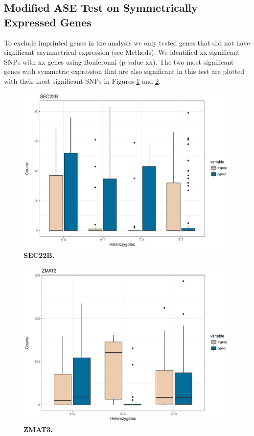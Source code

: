 \subsection{Modified ASE Test on Symmetrically Expressed Genes}\label{Modified ASE Test on Symmetrically Expressed Genes} 
To exclude imprinted genes in the analysis we only tested genes that did not have significant asymmetrical expression (see Methods). We identified xx significant SNPs with xx genes using Bonferonni (p-value xx). The two most significant genes with symmetric expression that are also significant in this test are plotted with their most significant SNPs in Figures \ref{fig:SEC22B} and \ref{fig:ZMAT3}.


\begin{figure}[!htb]
\centering \includegraphics[width=5in]{img/ch04/fig-09-SEC22B.pdf}
\caption[SEC22B.]{\textbf{SEC22B.} }
\label{fig:SEC22B}
\end{figure}


\begin{figure}[!htb]
\centering \includegraphics[width=5in]{img/ch04/fig-10-ZMAT3.pdf}
\caption[ZMAT3.]{\textbf{ZMAT3.} }
\label{fig:ZMAT3}
\end{figure}



